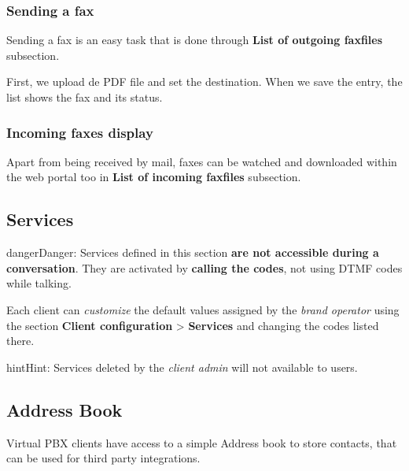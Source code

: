 \documentclass[letterpaper,10pt,english]{sphinxmanual}
\begin{document}
\subsubsection{Sending a fax}
\label{administration_portal/client/vpbx/faxes:sending-a-fax}
Sending a fax is an easy task that is done through \textbf{List of outgoing faxfiles} subsection.

First, we upload de PDF file and set the destination. When we save the entry, the list shows the fax and its status.


\subsubsection{Incoming faxes display}
\label{administration_portal/client/vpbx/faxes:incoming-faxes-display}
Apart from being received by mail, faxes can be watched and downloaded within
the web portal too in \textbf{List of incoming faxfiles} subsection.


\subsection{Services}
\label{administration_portal/client/vpbx/services:services}\label{administration_portal/client/vpbx/services:client-services}\label{administration_portal/client/vpbx/services::doc}
\begin{notice}{danger}{Danger:}
Services defined in this section \textbf{are not accessible during a
conversation}. They are activated by \textbf{calling the codes}, not using
DTMF codes while talking.
\end{notice}

Each client can \emph{customize} the default values assigned by the \emph{brand operator}
using the section \textbf{Client configuration} \textgreater{} \textbf{Services} and changing the codes
listed there.

\begin{notice}{hint}{Hint:}
Services deleted by the \emph{client admin} will not available to users.
\end{notice}


\subsection{Address Book}
\label{administration_portal/client/vpbx/addressbook:address-book}\label{administration_portal/client/vpbx/addressbook::doc}
Virtual PBX clients have access to a simple Address book to store contacts,
that can be used for third party integrations.
\end{document}
